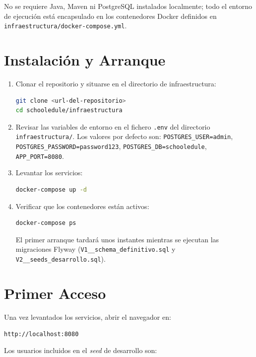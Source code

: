 \documentclass[12pt, a4paper]{report}
\begin{document}
No se requiere Java, Maven ni PostgreSQL instalados localmente; todo el entorno
de ejecución está encapsulado en los contenedores Docker definidos en
\texttt{infraestructura/docker-compose.yml}.

\section{Instalación y Arranque}

\begin{enumerate}
  \item Clonar el repositorio y situarse en el directorio de infraestructura:
\begin{lstlisting}[language=bash]
git clone <url-del-repositorio>
cd schooledule/infraestructura
\end{lstlisting}

  \item Revisar las variables de entorno en el fichero \texttt{.env} del
        directorio \texttt{infraestructura/}. Los valores por defecto son:
        \texttt{POSTGRES\_USER=admin}, \texttt{POSTGRES\_PASSWORD=password123},
        \texttt{POSTGRES\_DB=schooledule}, \texttt{APP\_PORT=8080}.

  \item Levantar los servicios:
\begin{lstlisting}[language=bash]
docker-compose up -d
\end{lstlisting}

  \item Verificar que los contenedores están activos:
\begin{lstlisting}[language=bash]
docker-compose ps
\end{lstlisting}

  El primer arranque tardará unos instantes mientras se ejecutan las
  migraciones Flyway (\texttt{V1\_\_schema\_definitivo.sql} y
  \texttt{V2\_\_seeds\_desarrollo.sql}).
\end{enumerate}

\section{Primer Acceso}

Una vez levantados los servicios, abrir el navegador en:

\begin{center}
  \texttt{http://localhost:8080}
\end{center}

Los usuarios incluidos en el \textit{seed} de desarrollo son:
\end{document}
